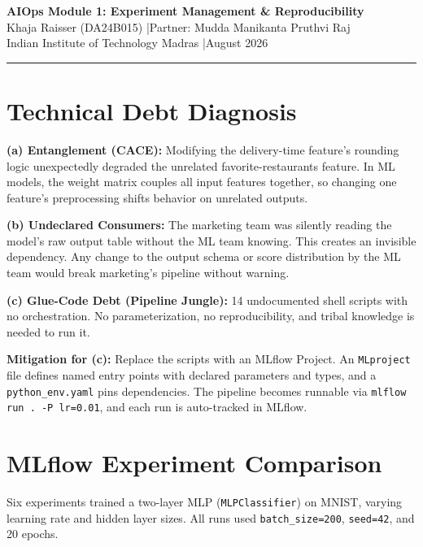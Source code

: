 \documentclass[10pt, a4paper]{article}
\begin{document}
\begin{center}
    {\Large \textbf{AIOps Module 1: Experiment Management \& Reproducibility}}\\[4pt]
    {\normalsize Khaja Raisser (DA24B015) \quad|\quad Partner: Mudda Manikanta Pruthvi Raj}\\[2pt]
    {\small Indian Institute of Technology Madras \quad|\quad August 2026}
\end{center}

\vspace{-2pt}
\hrule
\vspace{4pt}

\section{Technical Debt Diagnosis}

\textbf{(a) Entanglement (CACE):} Modifying the delivery-time feature's rounding logic unexpectedly degraded the unrelated favorite-restaurants feature. In ML models, the weight matrix couples all input features together, so changing one feature's preprocessing shifts behavior on unrelated outputs.

\textbf{(b) Undeclared Consumers:} The marketing team was silently reading the model's raw output table without the ML team knowing. This creates an invisible dependency. Any change to the output schema or score distribution by the ML team would break marketing's pipeline without warning.

\textbf{(c) Glue-Code Debt (Pipeline Jungle):} 14 undocumented shell scripts with no orchestration. No parameterization, no reproducibility, and tribal knowledge is needed to run it.

\textbf{Mitigation for (c):} Replace the scripts with an MLflow Project. An \texttt{MLproject} file defines named entry points with declared parameters and types, and a \texttt{python\_env.yaml} pins dependencies. The pipeline becomes runnable via \texttt{mlflow run .\ -P lr=0.01}, and each run is auto-tracked in MLflow.

\section{MLflow Experiment Comparison}

Six experiments trained a two-layer MLP (\texttt{MLPClassifier}) on MNIST, varying learning rate and hidden layer sizes. All runs used \texttt{batch\_size=200}, \texttt{seed=42}, and 20 epochs.
\end{document}

